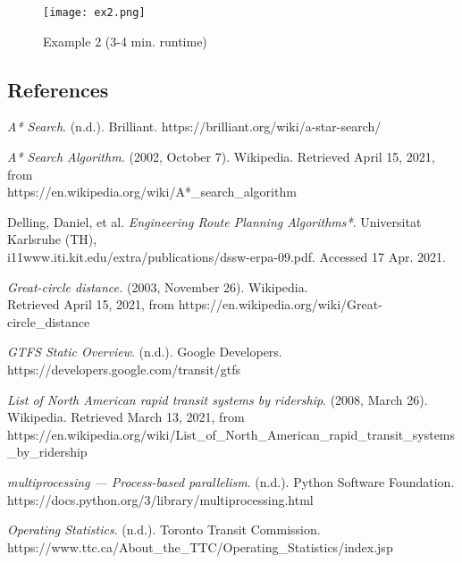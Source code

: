 \documentclass[fontsize=11pt]{article}
\begin{document}
    \begin{figure}[hbp]
        \centering
        \texttt{[image: ex2.png]}
        \caption{Example 2 (3-4 min. runtime)}
        \label{fig:ex2}
    \end{figure}

    \newpage

    \begin{center}
        \section*{References}
    \end{center}

    \hangindent=0.75in
    \textit{A* Search}. (n.d.). Brilliant. https://brilliant.org/wiki/a-star-search/

    \hangindent=0.75in
    \textit{A* Search Algorithm.} (2002, October 7). Wikipedia. Retrieved April 15, 2021, from \\
    https://en.wikipedia.org/wiki/A*\_search\_algorithm

    \hangindent=0.75in
    Delling, Daniel, et al. \textit{Engineering Route Planning Algorithms*}. Universitat Karlsruhe (TH), \\ i11www.iti.kit.edu/extra/publications/dssw-erpa-09.pdf. Accessed 17 Apr. 2021.

    \hangindent=0.75in
    \textit{Great-circle distance.} (2003, November 26). Wikipedia. \\
    Retrieved April 15, 2021, from https://en.wikipedia.org/wiki/Great-circle\_distance

    \hangindent=0.75in
    \textit{GTFS Static Overview}. (n.d.). Google Developers. https://developers.google.com/transit/gtfs

    \hangindent=0.75in
    \textit{List of North American rapid transit systems by ridership}. (2008, March 26). Wikipedia. Retrieved March 13, 2021, from https://en.wikipedia.org/wiki/List\_of\_North\_American\_rapid\_transit\_systems\_by\_ridership

    \hangindent=0.75in
    \textit{multiprocessing — Process-based parallelism}. (n.d.). Python Software Foundation. \\ https://docs.python.org/3/library/multiprocessing.html

    \hangindent=0.75in
    \textit{Operating Statistics}. (n.d.). Toronto Transit Commission. \\
    https://www.ttc.ca/About\_the\_TTC/Operating\_Statistics/index.jsp
\end{document}

